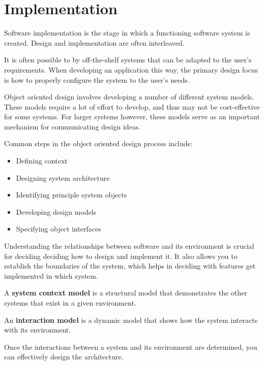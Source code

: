 \documentclass[12pt]{article}
\begin{document}
\setlength{\parskip}{0.1in}
\setlength{\parindent}{0in}

\setlength{\headheight}{0.5in}
\pagestyle{fancy}

\section*{Implementation}

Software implementation is the stage in which a functioning software system is
created. Design and implementation are often interleaved.

It is often possible to by off-the-shelf systems that can be adapted to the
user's requirements. When developing an application this way, the primary
design focus is how to properly configure the system to the user's needs.

Object oriented design involves developing a number of different system models.
These models require a lot of effort to develop, and thus may not be
cost-effective for some systems. For larger systems however, these models serve
as an important mechanism for communicating design ideas.

Common steps in the object oriented design process include:

\begin{itemize}
    \item Defining context
    \item Designing system architecture
    \item Identifying principle system objects
    \item Developing design models
    \item Specifying object interfaces
\end{itemize}

Understanding the relationships between software and its environment is crucial
for deciding deciding how to design and implement it. It also allows you to
establish the boundaries of the system, which helps in deciding with features
get implemented in which system.

A \textbf{system context model} is a structural model that demonstrates the
other systems that exist in a given environment.

An \textbf{interaction model} is a dynamic model that shows how the system
interacts with its environment.

Once the interactions between a system and its environment are determined, you
can effectively design the architecture.
\end{document}
